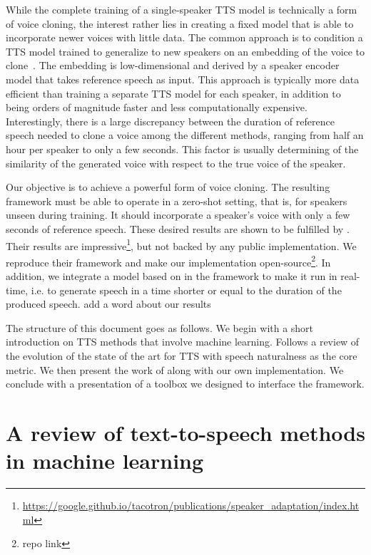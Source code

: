 \documentclass[a4paper, oneside, 12pt, english]{article}
\begin{document}
While the complete training of a single-speaker TTS model is technically a form of voice cloning, the interest rather lies in creating a fixed model that is able to incorporate newer voices with little data. The common approach is to condition a TTS model trained to generalize to new speakers on an embedding of the voice to clone~\citep{DeepVoice2, CloningFewSamples, SV2TTS}. The embedding is low-dimensional and derived by a speaker encoder model that takes reference speech as input. This approach is typically more data efficient than training a separate TTS model for each speaker, in addition to being orders of magnitude faster and less computationally expensive. Interestingly, there is a large discrepancy between the duration of reference speech needed to clone a voice among the different methods, ranging from half an hour per speaker to only a few seconds. This factor is usually determining of the similarity of the generated voice with respect to the true voice of the speaker.

Our objective is to achieve a powerful form of voice cloning. The resulting framework must be able to operate in a zero-shot setting, that is, for speakers unseen during training. It should incorporate a speaker's voice with only a few seconds of reference speech. These desired results are shown to be fulfilled by \citep{SV2TTS}. Their results are impressive\footnote{\url{https://google.github.io/tacotron/publications/speaker_adaptation/index.html}}, but not backed by any public implementation. We reproduce their framework and make our implementation open-source\footnote{\color{red} repo link}. In addition, we integrate a model based on \citep{WaveRNN} in the framework to make it run in real-time, i.e. to generate speech in a time shorter or equal to the duration of the produced speech. \color{red} add a word about our results \color{black}

The structure of this document goes as follows. We begin with a short introduction on TTS methods that involve machine learning. Follows a review of the evolution of the state of the art for TTS with speech naturalness as the core metric. We then present the work of \citep{SV2TTS} along with our own implementation. We conclude with a presentation of a toolbox we designed to interface the framework.


\section{A review of text-to-speech methods in machine learning}
\end{document}

